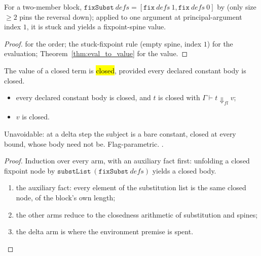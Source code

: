 \begin{lemma}
\label{lem:mf_fixSubst}
\leanok
{}
 For a two-member block, $\mathtt{fixSubst}\ defs = [\mathtt{fix}\ defs\ 1, \mathtt{fix}\ defs\ 0]$ by  (only size $\ge 2$ pins the reversal down); applied to one argument at principal-argument index $1$, it is stuck and yields a fixpoint-spine value.
\end{lemma}
\begin{proof}
\leanok
{}
  for the order; the stuck-fixpoint rule (empty spine, index $1$) for the evaluation; Theorem~\ref{thm:eval_to_value} for the value.
\end{proof}

\begin{theorem}
\label{thm:WcbvEval-lbClosed}
\leanok
{}
 The value of a closed term is \hl{closed}, provided every declared constant body is closed.
\begin{itemize}
\item {} every declared constant body is closed, and $t$ is closed with $\Gamma \vdash t \Downarrow_{fl} v$;
\item {} $v$ is closed.
\end{itemize}
 Unavoidable: at a delta step the subject is a bare constant, closed at every bound, whose body need not be. Flag-parametric.
 \stProved{}.
\end{theorem}
\begin{proof}
\leanok
{}
 Induction over every arm, with an auxiliary fact first: unfolding a closed fixpoint node by $\mathtt{substList}\ (\mathtt{fixSubst}\ defs)$ yields a closed body.
\begin{enumerate}
\item the auxiliary fact: every element of the substitution list is the same closed  node, of the block's own length;
\item the other arms reduce to the closedness arithmetic of substitution and spines;
\item the delta arm is where the environment premise is spent.
\end{enumerate}
\end{proof}


